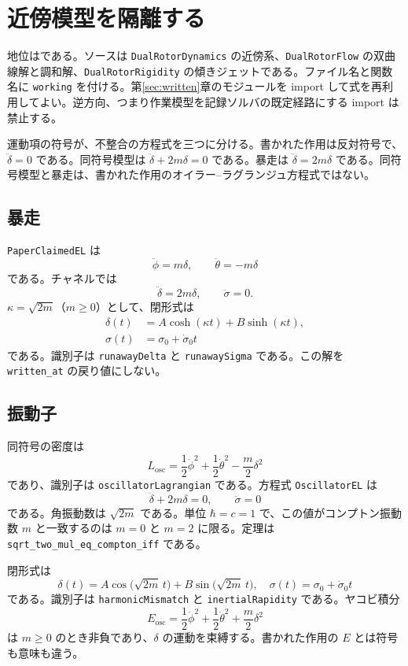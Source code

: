 \section{近傍模型を隔離する}
\label{sec:working}

地位は\dstwork{}である。ソースは \texttt{DualRotorDynamics} の近傍系、\texttt{DualRotorFlow} の双曲線解と調和解、\texttt{DualRotorRigidity} の傾きジェットである。ファイル名と関数名に \texttt{working} を付ける。第\ref{sec:written}章のモジュールを import して式を再利用してよい。逆方向、つまり作業模型を記録ソルバの既定経路にする import は禁止する。

運動項の符号が、不整合の方程式を三つに分ける。書かれた作用は反対符号で、\(\ddot\delta=0\) である。同符号模型は \(\ddot\delta+2m\delta=0\) である。暴走は \(\ddot\delta=2m\delta\) である。同符号模型と暴走は、書かれた作用のオイラー--ラグランジュ方程式ではない。

\subsection{暴走}

\texttt{PaperClaimedEL} は
\[
\ddot\phi=m\delta,\qquad \ddot\theta=-m\delta
\]
である。チャネルでは
\[
\ddot\delta=2m\delta,\qquad \ddot\sigma=0.
\]
\(\kappa=\sqrt{2m}\)（\(m\ge 0\)）として、閉形式は
\begin{align}
\delta(t)&=A\cosh(\kappa t)+B\sinh(\kappa t),\\
\sigma(t)&=\sigma_0+\dot\sigma_0 t
\end{align}
である。識別子は \texttt{runawayDelta} と \texttt{runawaySigma} である。この解を \texttt{written\_at} の戻り値にしない。

\subsection{振動子}

同符号の密度は
\[
L_{\mathrm{osc}}=\frac12\dot\phi^2+\frac12\dot\theta^2-\frac m2\delta^2
\]
であり、識別子は \texttt{oscillatorLagrangian} である。方程式 \texttt{OscillatorEL} は
\[
\ddot\delta+2m\delta=0,\qquad \ddot\sigma=0
\]
である。角振動数は \(\sqrt{2m}\) である。単位 \(\hbar=c=1\) で、この値がコンプトン振動数 \(m\) と一致するのは \(m=0\) と \(m=2\) に限る。定理は \texttt{sqrt\_two\_mul\_eq\_compton\_iff} である。

閉形式は
\[
\delta(t)=A\cos\bigl(\sqrt{2m}\,t\bigr)+B\sin\bigl(\sqrt{2m}\,t\bigr),
\quad
\sigma(t)=\sigma_0+\dot\sigma_0 t
\]
である。識別子は \texttt{harmonicMismatch} と \texttt{inertialRapidity} である。ヤコビ積分
\[
E_{\mathrm{osc}}=\frac12\dot\phi^2+\frac12\dot\theta^2+\frac m2\delta^2
\]
は \(m\ge 0\) のとき非負であり、\(\delta\) の運動を束縛する。書かれた作用の \(E\) とは符号も意味も違う。

